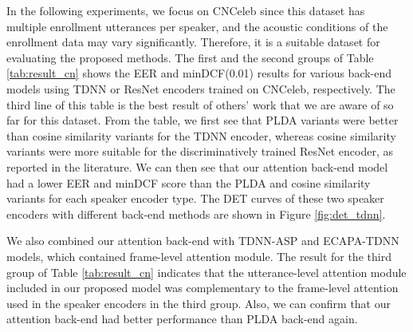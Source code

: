 \documentclass{article}
\begin{document}
In the following experiments, we focus on CNCeleb since this dataset has multiple enrollment utterances per speaker, and the acoustic conditions of the enrollment data may vary significantly. Therefore, it is a suitable dataset for evaluating the proposed methods. The first and the second groups of Table \ref{tab:result_cn} shows the EER and minDCF(0.01) results for various back-end models using TDNN or ResNet encoders trained on CNCeleb, respectively. The third line of this table is the best result of others' work that we are aware of so far for this dataset.
From the table, we first see that PLDA variants were better than cosine similarity variants for the TDNN encoder, whereas cosine similarity variants were more suitable for the discriminatively trained ResNet encoder, as reported in the literature. We can then see that our attention back-end model had a lower EER and minDCF score than the PLDA and cosine similarity variants for each speaker encoder type. 
The DET curves of these two speaker encoders with different back-end methods are shown in Figure \ref{fig:det_tdnn}.


We also combined our attention back-end with TDNN-ASP and ECAPA-TDNN models, which contained frame-level attention module. The result for the third group of Table \ref{tab:result_cn} indicates that the utterance-level attention module included in our proposed model was complementary to the frame-level attention used in the speaker encoders in the third group. Also, we can confirm that our attention back-end had better performance than PLDA back-end again.
\vspace{-1mm}
 
\end{document}
